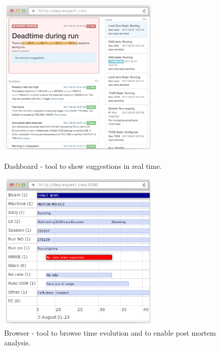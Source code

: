 \documentclass[a4paper]{jpconf}
\begin{document}
\begin{figure}[h]
\begin{minipage}{18pc}
\includegraphics[width=18pc]{tool-dashboard2.png}
\caption{\label{dashboard-tool}Dashboard - tool to show suggestions in real time.}
\end{minipage} \hspace{2pc}%
\begin{minipage}{18pc}
\includegraphics[width=18pc]{tool-browser2.png}
\caption{\label{browser-tool}Browser - tool to browse time evolution and to enable post mortem analysis.}
\end{minipage}
\end{figure}
\end{document}
